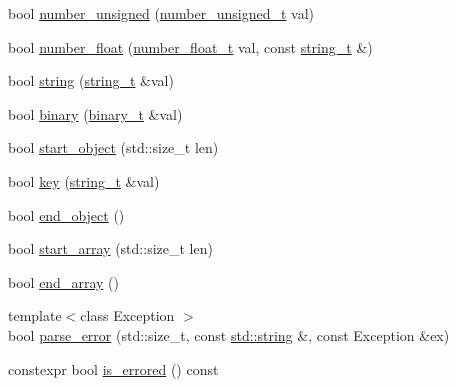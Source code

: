 \begin{DoxyCompactItemize}
\item 
bool \hyperlink{classnlohmann_1_1detail_1_1json__sax__dom__parser_a2b4ff5146ed46993527e4a67d99c1355}{number\+\_\+unsigned} (\hyperlink{classnlohmann_1_1detail_1_1json__sax__dom__parser_a90f19b272530a479db81db11be2ea15c}{number\+\_\+unsigned\+\_\+t} val)
\item 
bool \hyperlink{classnlohmann_1_1detail_1_1json__sax__dom__parser_aef4652c0e81d6c052acb5d36afe09499}{number\+\_\+float} (\hyperlink{classnlohmann_1_1detail_1_1json__sax__dom__parser_ad8da3aad0147b18b3cb76868480300fe}{number\+\_\+float\+\_\+t} val, const \hyperlink{classnlohmann_1_1detail_1_1json__sax__dom__parser_afd4d961ab2a6b01cbe6e840f7fb90cdc}{string\+\_\+t} \&)
\item 
bool \hyperlink{classnlohmann_1_1detail_1_1json__sax__dom__parser_a851d965082d20a726138f5d0330dc7d8}{string} (\hyperlink{classnlohmann_1_1detail_1_1json__sax__dom__parser_afd4d961ab2a6b01cbe6e840f7fb90cdc}{string\+\_\+t} \&val)
\item 
bool \hyperlink{classnlohmann_1_1detail_1_1json__sax__dom__parser_acc05c450d515f0f95c37401bf23c8db3}{binary} (\hyperlink{classnlohmann_1_1detail_1_1json__sax__dom__parser_a188c267325965fdbe487ce68ab5496aa}{binary\+\_\+t} \&val)
\item 
bool \hyperlink{classnlohmann_1_1detail_1_1json__sax__dom__parser_a9929b4cc92d471c49bd0a92802629f90}{start\+\_\+object} (std\+::size\+\_\+t len)
\item 
bool \hyperlink{classnlohmann_1_1detail_1_1json__sax__dom__parser_ad427febda4997cbd8345a2596af66649}{key} (\hyperlink{classnlohmann_1_1detail_1_1json__sax__dom__parser_afd4d961ab2a6b01cbe6e840f7fb90cdc}{string\+\_\+t} \&val)
\item 
bool \hyperlink{classnlohmann_1_1detail_1_1json__sax__dom__parser_a88de4907ad5668d0358af2135236101f}{end\+\_\+object} ()
\item 
bool \hyperlink{classnlohmann_1_1detail_1_1json__sax__dom__parser_a056b895d011efaf48ea096c024aca0d4}{start\+\_\+array} (std\+::size\+\_\+t len)
\item 
bool \hyperlink{classnlohmann_1_1detail_1_1json__sax__dom__parser_af7cb5e5fe06ea908b0ce4ed762919759}{end\+\_\+array} ()
\item 
{\footnotesize template$<$class Exception $>$ }\\bool \hyperlink{classnlohmann_1_1detail_1_1json__sax__dom__parser_a7bc7d26e6a6f30185310de42cb2e820d}{parse\+\_\+error} (std\+::size\+\_\+t, const \hyperlink{namespacenlohmann_1_1detail_a1ed8fc6239da25abcaf681d30ace4985ab45cffe084dd3d20d928bee85e7b0f21}{std\+::string} \&, const Exception \&ex)
\item 
constexpr bool \hyperlink{classnlohmann_1_1detail_1_1json__sax__dom__parser_a5e6639496aff24bffa6ce166942cda7b}{is\+\_\+errored} () const 
\end{DoxyCompactItemize}

